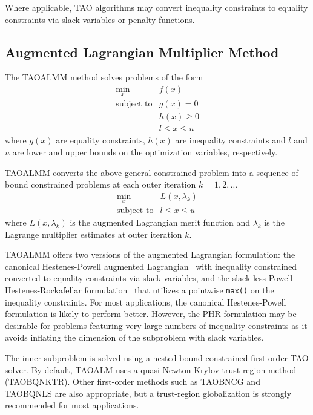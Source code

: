 Where applicable, TAO algorithms may convert inequality constraints
to equality constraints via slack variables or penalty functions.

\subsection{Augmented Lagrangian Multiplier Method}

The TAOALMM method solves problems of the form
\[
\begin{array}{ll}
\displaystyle \min_{x} & f(x) \\
\mbox{subject to} & g(x) = 0\\
                  & h(x) \geq 0 \\
                  & l \leq x \leq u
\end{array}
\]
where $g(x)$ are equality constraints, $h(x)$ are inequality constraints
and $l$ and $u$ are lower and upper bounds on the optimization variables,
respectively.

TAOALMM converts the above general constrained problem into a sequence of
bound constrained problems at each outer iteration $k = 1,2,\dots$
\[
\begin{array}{ll}
\displaystyle \min_{x} & L(x, \lambda_k) \\
\mbox{subject to} & l \leq x \leq u
\end{array}
\]
where $L(x, \lambda_k)$ is the augmented Lagrangian merit function and $\lambda_k$
is the Lagrange multiplier estimates at outer iteration $k$.

TAOALMM offers two versions of the augmented Lagrangian formulation: the
canonical Hestenes-Powell augmented Lagrangian~\cite{hestenes1969multiplier,powell1969method}
with inequality constrained converted to equality constraints via slack variables,
and the slack-less Powell-Hestenes-Rockafellar formulation~\cite{rockafellar1974augmented}
that utilizes a pointwise {\tt max()} on the inequality constraints. For most applications,
the canonical Hestenes-Powell formulation is likely to perform better. However, the PHR
formulation may be desirable for problems featuring very large numbers of inequality
constraints as it avoids inflating the dimension of the subproblem with slack variables.

The inner subproblem is solved using a nested bound-constrained first-order TAO solver.
By default, TAOALM uses a quasi-Newton-Krylov trust-region method (TAOBQNKTR). Other
first-order methods such as TAOBNCG and TAOBQNLS are also appropriate, but a trust-region
globalization is strongly recommended for most applications.

